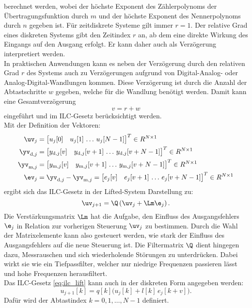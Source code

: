 berechnet werden, wobei der höchste Exponent des Zählerpolynoms der Übertragungsfunktion durch $m$ und der höchste Exponent des Nennerpolynoms durch $n$ gegeben ist. Für zeitdiskrete Systeme gilt immer $r=1$. Der relative Grad eines diskreten Systems gibt den Zeitindex $r$ an, ab dem eine direkte Wirkung des Eingangs auf den Ausgang erfolgt. Er kann daher auch als Verzögerung interpretiert werden. \\
In praktischen Anwendungen kann es neben der Verzögerung durch den relativen Grad $r$ des Systems auch zu Verzögerungen aufgrund von Digital-Analog- oder Analog-Digital-Wandlungen kommen. Diese Verzögerung ist durch die Anzahl der Abtastschritte $w$ gegeben, welche für die Wandlung benötigt werden. Damit kann eine Gesamtverzögerung
\begin{equation}
	\label{eq:m}
	v = r + w
\end{equation}
eingeführt und im ILC-Gesetz berücksichtigt werden. \\

Mit der Definition der Vektoren:
\begin{align}
	\label{eq:u_vec}
	\uv_j &= \bigl[u_j[0] \quad u_j[1] \,  \ldots \, u_j[N-1] \bigr]^T \in R^{N \times 1} \\
	\yv_{\mathrm{d},j} &= \bigl[y_{\mathrm{d},j}[v] \quad y_{\mathrm{d},j}[v+1] \, \ldots \, y_{\mathrm{d},j}[v+N-1] \bigr]^T \in R^{N \times 1} \\
	\yv_{\mathrm{m},j} &= \bigl[y_{\mathrm{m},j}[v] \quad y_{\mathrm{m},j}[v+1] \, \ldots \, y_{\mathrm{m},j}[v+N-1] \bigr]^T \in R^{N \times 1} \\
	\ev_{j} &= \yv_{\mathrm{d},j} - \yv_{\mathrm{m},j} = \bigl[e_{j}[v] \quad e_{j}[v+1] \, \ldots \, e_{j}[v+N-1] \bigr]^T \in R^{N \times 1} \label{eq:evec_def}
\end{align}
ergibt sich das ILC-Gesetz in der Lifted-System Darstellung zu:
\begin{equation}
	\label{eq:ilc_lift}
	\uv_{j+1} = \Q\left(\uv_j + \Lm \e_j\right).
\end{equation}
Die Verstärkungsmatrix $\Lm$ hat die Aufgabe, den Einfluss des Ausgangsfehlers $\e_j$ in Relation zur vorherigen Steuerung $\uv_j$ zu bestimmen. Durch die Wahl der Matrixelemente kann also gesteuert werden, wie stark der Einfluss des Ausgangsfehlers auf die neue Steuerung ist. Die Filtermatrix $\Q$ dient hingegen dazu, Messrauschen und sich wiederholende Störungen zu unterdrücken. Dabei wirkt sie wie ein Tiefpassfilter, welcher nur niedrige Frequenzen passieren lässt und hohe Frequenzen herausfiltert. \\
Das ILC-Gesetz \autoref{eq:ilc_lift} kann auch in der diskreten Form angegeben werden:
\begin{equation}
	\label{eq:ilc_diskret}
	u_{j+1}[k] = q[k] \bigl(u_j[k] + l[k] \, e_j[k+v]\bigr).
\end{equation}
Dafür wird der Abtastindex $k = 0,1,\ldots,N-1$ definiert.
